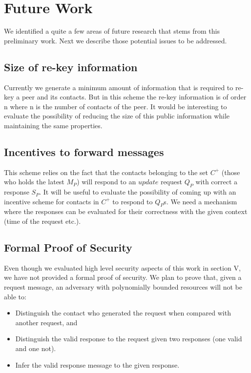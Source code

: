 \section{Future Work}

We identified a quite a few areas of future research that stems from this preliminary work. Next we describe those potential issues to be addressed.

\subsection{Size of re-key information}
Currently we generate a minimum amount of information that is required to re-key a peer and its contacts. But in this scheme the re-key information is of order n where n is the number of contacts of the peer. It would be interesting to evaluate the possibility of reducing the size of this public information while maintaining the same properties.

\subsection{Incentives to forward messages}
This scheme relies on the fact that the contacts belonging to the set $C^+$ (those who holds the latest $M_P$) will respond to an $update$ request $Q_P$ with correct a response $S_P$. It will be useful to evaluate the possibility of coming up with an incentive scheme for contacts in $C^+$ to respond to $Q_P$s. We need a mechanism where the responses can be evaluated for their correctness with the given context (time of the request etc.).

\subsection{Formal Proof of Security}
Even though we evaluated high level security aspects of this work in section V, we have not provided a formal proof of security. We plan to prove that, given a request message, an adversary with polynomially bounded resources will not be able to:
\begin{itemize}
\item Distinguish the contact who generated the request when compared with another request, and
\item Distinguish the valid response to the request given two responses (one valid and one not).
\item Infer the valid response message to the given response.
\end{itemize}

